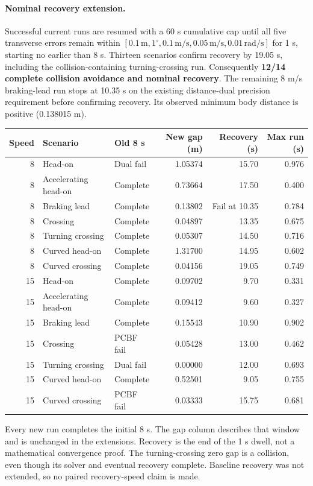 \documentclass[11pt]{article}
\begin{document}
\paragraph{Nominal recovery extension.} Successful current runs are resumed
with a 60 s cumulative cap until all five transverse errors remain within
$[0.1\,\mathrm m,1^\circ,0.1\,\mathrm{m/s},0.05\,\mathrm{m/s},
0.01\,\mathrm{rad/s}]$ for 1 s, starting no earlier than 8 s. Thirteen
scenarios confirm recovery by 19.05 s, including the collision-containing
turning-crossing run. Consequently \textbf{12/14 complete collision avoidance
and nominal recovery}. The remaining 8 m/s braking-lead run stops at
10.35 s on the existing distance-dual precision requirement before confirming
recovery. Its observed minimum body distance is positive (0.138015 m).

\begin{center}\small
\begin{tabular}{rl l r r r}
\toprule
Speed & Scenario & Old 8 s & New gap (m) & Recovery (s) & Max run (s)\\
\midrule
8 & Head-on & Dual fail & 1.05374 & 15.70 & 0.976 \\
8 & Accelerating head-on & Complete & 0.73664 & 17.50 & 0.400 \\
8 & Braking lead & Complete & 0.13802 & Fail at 10.35 & 0.784 \\
8 & Crossing & Complete & 0.04897 & 13.35 & 0.675 \\
8 & Turning crossing & Complete & 0.05307 & 14.50 & 0.716 \\
8 & Curved head-on & Complete & 1.31700 & 14.95 & 0.602 \\
8 & Curved crossing & Complete & 0.04156 & 19.05 & 0.749 \\
15 & Head-on & Complete & 0.09702 & 9.70 & 0.331 \\
15 & Accelerating head-on & Complete & 0.09412 & 9.60 & 0.327 \\
15 & Braking lead & Complete & 0.15543 & 10.90 & 0.902 \\
15 & Crossing & PCBF fail & 0.05428 & 13.00 & 0.462 \\
15 & Turning crossing & Dual fail & 0.00000 & 12.00 & 0.693 \\
15 & Curved head-on & Complete & 0.52501 & 9.05 & 0.755 \\
15 & Curved crossing & PCBF fail & 0.03333 & 15.75 & 0.681 \\
\bottomrule
\end{tabular}
\end{center}
Every new run completes the initial 8 s. The gap column describes that window
and is unchanged in the extensions. Recovery is the end of the 1 s dwell,
not a mathematical convergence proof. The turning-crossing zero gap is a
collision, even though its solver and eventual recovery complete. Baseline
recovery was not extended, so no paired recovery-speed claim is made.
\end{document}
